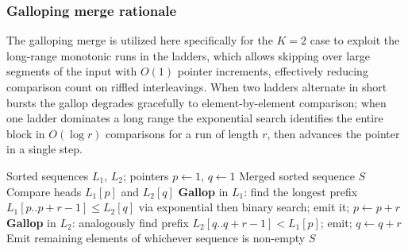 \documentclass[12pt,a4paper]{article}
\theoremstyle{plain}
\theoremstyle{definition}
\begin{document}
\subsubsection{Galloping merge rationale}
The galloping merge is utilized here specifically for the $K=2$ case to
exploit the long-range monotonic runs in the ladders, which allows skipping
over large segments of the input with $O(1)$ pointer increments, effectively
reducing comparison count on riffled interleavings.  When two ladders
alternate in short bursts the gallop degrades gracefully to element-by-element
comparison; when one ladder dominates a long range the exponential search
identifies the entire block in $O(\log r)$ comparisons for a run of length
$r$, then advances the pointer in a single step.
\begin{algorithm}[H]
\caption{\textsc{TwoWayGalloping}$(L_1, L_2)$}
\label{alg:gallop}
\begin{algorithmic}[1]
\Require Sorted sequences $L_1$, $L_2$; pointers $p \gets 1$, $q \gets 1$
\Ensure Merged sorted sequence $S$
    \State Compare heads $L_1[p]$ and $L_2[q]$
        \State \textbf{Gallop} in $L_1$: find the longest prefix $L_1[p..p+r-1] \le L_2[q]$ via exponential then binary search; emit it; $p \gets p + r$
    \Else
        \State \textbf{Gallop} in $L_2$: analogously find prefix $L_2[q..q+r-1] < L_1[p]$; emit; $q \gets q + r$
    \EndIf
\EndWhile
\State Emit remaining elements of whichever sequence is non-empty
\State \Return $S$
\end{algorithmic}
\end{algorithm}
\end{document}
